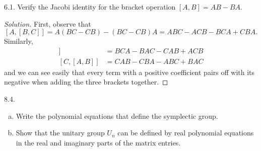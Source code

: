 \documentclass[11pt]{scrartcl}
\providecommand{\ii}{\item}
\newenvironment{soln}{\begin{proof}[Solution]}{\end{proof}}
\begin{document}
\begin{problem*}6.1.
	Verify the Jacobi identity for the bracket operation
	$[A,B] = AB - BA$.
\end{problem*}

\begin{soln}
	First, observe that
	\[[A, [B,C]] = A(BC-CB) - (BC-CB)A = ABC - ACB - BCA + CBA.\]
	Similarly,
	\begin{align*}
		[B, [C,A]] &= BCA - BAC - CAB + ACB\\
		[C, [A,B]] &= CAB - CBA - ABC + BAC
	\end{align*}
	and we can see easily that every term with a positive coefficient
	pairs off with its negative when adding the three brackets together.
\end{soln}

\begin{problem*}8.4.
	\begin{enumerate}[(a)]
		\ii Write the polynomial equations that define the symplectic group.
		\ii Show that the unitary group $U_n$ can be defined by
		real polynomial equations in the real and imaginary parts
		of the matrix entries.
	\end{enumerate}
\end{problem*}
\end{document}
